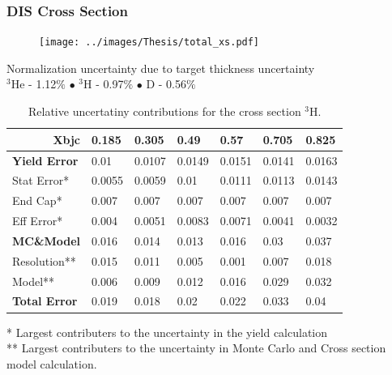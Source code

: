 \documentclass[12pt,usenames,dvipsnames]{beamer}
\begin{document}
\begin{frame}{}
\frametitle{DIS Cross Section}
\centering
\vspace{-20pt}
\begin{figure}
	\texttt{[image: ../images/Thesis/total\_xs.pdf]}
\end{figure}

Normalization uncertainty due to target thickness uncertainty\\
$^3$He - 1.12$\%$ $\bullet$ $^3$H - 0.97$\%$ $\bullet$  D - 0.56$\%$
\end{frame}
\begin{frame}{}

\begin{table}[]
	\caption*{Relative uncertatiny contributions for the cross section $^3$H.}
	\begin{tabular}{|p{2.2cm}|l|l|l|l|l|l|}
\hline
\multicolumn{1}{|r|}{\textbf{Xbjc}} & \textbf{0.185} & \textbf{0.305} & \textbf{0.49} & \textbf{0.57} & \textbf{0.705} & \textbf{0.825} \\ \hline
\textbf{Yield Error}                & 0.01           & 0.0107         & 0.0149        & 0.0151        & 0.0141         & 0.0163         \\ \hline
Stat Error*                         & 0.0055         & 0.0059         & 0.01          & 0.0111        & 0.0113         & 0.0143         \\ \hline
End Cap*                            & 0.007          & 0.007          & 0.007         & 0.007         & 0.007          & 0.007          \\ \hline
Eff Error*                          & 0.004          & 0.0051         & 0.0083        & 0.0071        & 0.0041         & 0.0032         \\ \hline\hline
\textbf{MC\&Model}                  & 0.016          & 0.014          & 0.013         & 0.016         & 0.03           & 0.037          \\ \hline
Resolution**                        & 0.015          & 0.011          & 0.005         & 0.001         & 0.007          & 0.018          \\ \hline
Model**                             & 0.006          & 0.009          & 0.012         & 0.016         & 0.029          & 0.032          \\ \hline\hline
\textbf{Total Error}                & 0.019          & 0.018          & 0.02          & 0.022         & 0.033          & 0.04           \\ \hline
\end{tabular}

	* Largest contributers to the uncertainty in the yield calculation\\
	** Largest contributers to the uncertainty in Monte Carlo and Cross section model calculation. 

\end{table}


\end{frame}
\end{document}
